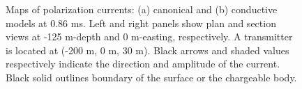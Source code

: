 \documentclass[extra,mreferee]{gji}
\begin{document}
\begin{figure}
  \caption{Maps of polarization currents: (a) canonical and (b) conductive models at 0.86 ms. Left and right panels show plan and section views at -125 m-depth and 0 m-easting, respectively. A transmitter is located at (-200 m, 0 m, 30 m). Black arrows and shaded values respectively indicate the direction and amplitude of the current. Black solid outlines boundary of the surface or the chargeable body.}
  \label{F:Polarizationcurrent_early}
\end{figure}
\end{document}
